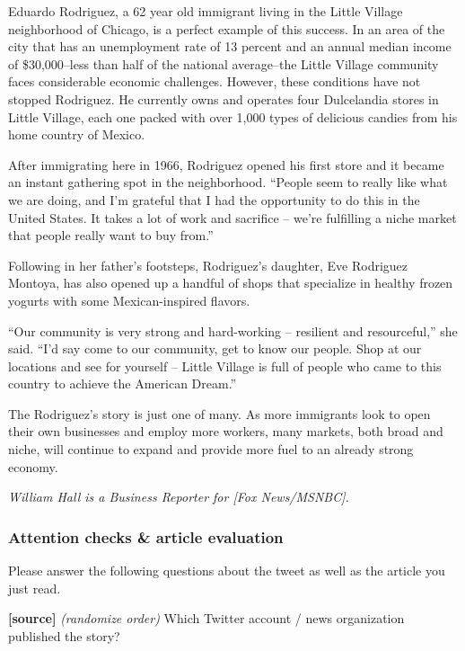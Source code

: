 \documentclass[]{article}
\begin{document}
Eduardo Rodriguez, a 62 year old immigrant living in the Little Village
neighborhood of Chicago, is a perfect example of this success. In an
area of the city that has an unemployment rate of 13 percent and an
annual median income of \$30,000--less than half of the national
average--the Little Village community faces considerable economic
challenges. However, these conditions have not stopped Rodriguez. He
currently owns and operates four Dulcelandia stores in Little Village,
each one packed with over 1,000 types of delicious candies from his home
country of Mexico.

After immigrating here in 1966, Rodriguez opened his first store and it
became an instant gathering spot in the neighborhood. ``People seem to
really like what we are doing, and I'm grateful that I had the
opportunity to do this in the United States. It takes a lot of work and
sacrifice -- we're fulfilling a niche market that people really want to
buy from.''

Following in her father's footsteps, Rodriguez's daughter, Eve Rodriguez
Montoya, has also opened up a handful of shops that specialize in
healthy frozen yogurts with some Mexican-inspired flavors.

``Our community is very strong and hard-working -- resilient and
resourceful,'' she said. ``I'd say come to our community, get to know
our people. Shop at our locations and see for yourself -- Little Village
is full of people who came to this country to achieve the American
Dream.''

The Rodriguez's story is just one of many. As more immigrants look to
open their own businesses and employ more workers, many markets, both
broad and niche, will continue to expand and provide more fuel to an
already strong economy.

\emph{William Hall is a Business Reporter for {[}Fox News/MSNBC{]}.}

\hypertarget{attention-checks-article-evaluation}{%
\subsubsection{Attention checks \& article
evaluation}\label{attention-checks-article-evaluation}}

Please answer the following questions about the tweet as well as the
article you just read.

\textbf{{[}source{]}} \emph{(randomize order)} Which Twitter account /
news organization published the story?
\end{document}
